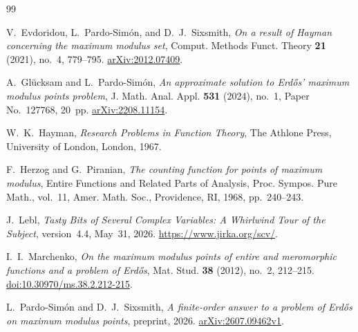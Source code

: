 \documentclass[11pt,reqno]{amsart}
\theoremstyle{remark}
\numberwithin{equation}{section}
\begin{document}
\begin{thebibliography}{99}

V.~Evdoridou, L.~Pardo-Sim\'on, and D.~J.~Sixsmith,
\emph{On a result of Hayman concerning the maximum modulus set},
Comput. Methods Funct. Theory \textbf{21} (2021), no.~4, 779--795.
\href{https://arxiv.org/abs/2012.07409}{arXiv:2012.07409}.

A.~Gl\"ucksam and L.~Pardo-Sim\'on,
\emph{An approximate solution to Erd\H{o}s' maximum modulus points problem},
J. Math. Anal. Appl. \textbf{531} (2024), no.~1, Paper No.~127768, 20~pp.
\href{https://arxiv.org/abs/2208.11154}{arXiv:2208.11154}.

W.~K.~Hayman, \emph{Research Problems in Function Theory},
The Athlone Press, University of London, London, 1967.

F.~Herzog and G.~Piranian,
\emph{The counting function for points of maximum modulus},
Entire Functions and Related Parts of Analysis,
Proc. Sympos. Pure Math., vol.~11,
Amer. Math. Soc., Providence, RI, 1968, pp.~240--243.

J.~Lebl, \emph{Tasty Bits of Several Complex Variables:
A Whirlwind Tour of the Subject}, version~4.4, May~31, 2026.
\url{https://www.jirka.org/scv/}.

I.~I.~Marchenko,
\emph{On the maximum modulus points of entire and meromorphic functions
and a problem of Erd\H{o}s},
Mat. Stud. \textbf{38} (2012), no.~2, 212--215.
\href{https://doi.org/10.30970/ms.38.2.212-215}{doi:10.30970/ms.38.2.212-215}.

L.~Pardo-Sim\'on and D.~J.~Sixsmith,
\emph{A finite-order answer to a problem of Erd\H{o}s on maximum modulus points},
preprint, 2026.
\href{https://arxiv.org/abs/2607.09462v1}{arXiv:2607.09462v1}.

\end{thebibliography}
\end{document}

